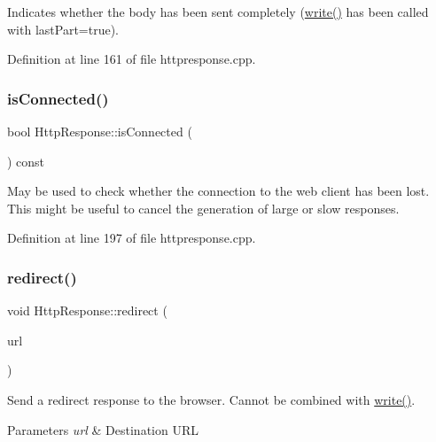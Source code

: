Indicates whether the body has been sent completely (\mbox{\hyperlink{classstefanfrings_1_1_http_response_a6e49919cc568835ca6d81fec02533260}{write()}} has been called with last\+Part=true). 

Definition at line 161 of file httpresponse.\+cpp.

\mbox{\label{classstefanfrings_1_1_http_response_a1869ed834437286ba88ab72027d12463}} 
\subsubsection{\texorpdfstring{is\+Connected()}{isConnected()}}
{\footnotesize\ttfamily bool Http\+Response\+::is\+Connected (\begin{DoxyParamCaption}{ }\end{DoxyParamCaption}) const}

May be used to check whether the connection to the web client has been lost. This might be useful to cancel the generation of large or slow responses. 

Definition at line 197 of file httpresponse.\+cpp.

\mbox{\label{classstefanfrings_1_1_http_response_afb4d442dd120b515d472aff13074275a}} 
\subsubsection{\texorpdfstring{redirect()}{redirect()}}
{\footnotesize\ttfamily void Http\+Response\+::redirect (\begin{DoxyParamCaption}\item[{const Q\+Byte\+Array \&}]{url }\end{DoxyParamCaption})}

Send a redirect response to the browser. Cannot be combined with \mbox{\hyperlink{classstefanfrings_1_1_http_response_a6e49919cc568835ca6d81fec02533260}{write()}}. 
\begin{DoxyParams}{Parameters}
{\em url} & Destination U\+RL \\
\hline
\end{DoxyParams}


